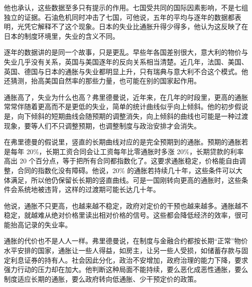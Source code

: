 他也承认，这些数据至多只有提示的作用\cite{friedman1976}。七国受共同的国际因素影响，不是七组独立的证据\cite{friedman1976}。石油危机同时冲击了七国，可他说，五年的平均与逐年的数据都表明，光凭它解释不了这个现象\cite{friedman1976}。日本的失业比通胀升得少得多，他认为这反映了在日本的制度环境里，失业的含义不同\cite{friedman1976}。

逐年的数据讲的是同一个故事，只是更乱\cite{friedman1976}。早些年各国差别很大，意大利的物价与失业几乎没有关系，英国与美国逐年的反向关系相当清楚\cite{friedman1976}。近几年，法国、美国、英国、德国与日本的通胀与失业都明显上升，只有瑞典与意大利不合这个模式\cite{friedman1976}。他还猜测，抬高美国自然率的那些力量，也可能在别的国家起作用\cite{friedman1976}。

通胀高了，失业为什么也高？弗里德曼说，近年来，在几年的时段里，更高的通胀常常伴随着更高而不是更低的失业，简单的统计曲线似乎向上倾斜\cite{friedman1976}。他的初步假说是，向下倾斜的短期曲线会随预期的调整消失，向上倾斜的曲线也可能是一种过渡现象，要等人们不只调整预期，也调整制度与政治安排才会消失\cite{friedman1976}。

在弗里德曼的假说里，竖直的长期曲线对应的是完全预期到的通胀\cite{friedman1976}。预期的通胀若是每年 20\%，长期工资合同会让工资每年比零通胀时多涨 20\%，长期贷款的利率高出 20 个百分点，等于把所有合同都指数化了\cite{friedman1976}。这要求通胀稳定，价格能自由调整，合同的指数化没有障碍\cite{friedman1976}。他说，20\% 的通胀若持续几十年，这些条件可以大体满足，所以他仍保留长长期的竖直曲线\cite{friedman1976}。可是一国刚转向更高的通胀时，这些条件会系统地被违背，这样的过渡期可能长达几十年\cite{friedman1976}。

他说，通胀不只更高，也越来越不稳定，政府对定价的干预也越来越多\cite{friedman1976}。通胀越不稳定，就越难从绝对价格里读出相对价格的信号\cite{friedman1976}。这些都会降低经济的效率，很可能抬高记录的失业率\cite{friedman1976}。

通胀的代价也不是人人一样。弗里德曼说，在制度与金融合约都按长期“正常”物价水平安排的国家，通胀让一些人得益，如房主，让另一些人受损，如储蓄存款与固定利息证券的持有人\cite{friedman1976}。社会因此分化，政治不安增加，政府治理的能力下降，要求强力行动的压力却在加大\cite{friedman1976}。他判断这种局面不能持续，要么恶化成恶性通胀，要么制度适应长期的通胀，要么政府转向低通胀、少干预定价的政策\cite{friedman1976}。

